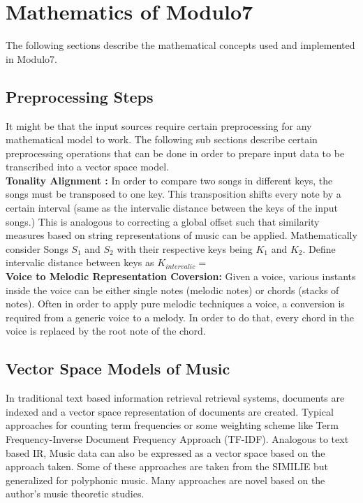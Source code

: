 \chapter{Mathematics of Modulo7}
\label{sec:mir math}

\noindent The following sections describe the mathematical concepts used and implemented in Modulo7.

\section{Preprocessing Steps} \label{sim:preprocess}

\noindent It might be that the input sources require certain preprocessing for any mathematical model to work. The following sub sections describe certain preprocessing operations that can be done in order to prepare input data to be transcribed into a vector space model. \\

\noindent \textbf{Tonality Alignment :} In order to compare two songs in different keys, the songs must be transposed to one key. This transposition shifts every note by a certain interval (same as the intervalic distance between the keys of the input songs.) This is analogous to correcting a global offset such that similarity measures based on string representations of music can be applied. Mathematically consider Songs $S_1$ and $S_2$ with their respective keys being $K_1$ and $K_2$. Define intervalic distance between keys as $K_{intervalic} = $ \\

\noindent \textbf{Voice to Melodic Representation Coversion: } \label{voicemelconv} Given a voice, various instants inside the voice can be either single notes (melodic notes) or chords (stacks of notes). Often in order to apply pure melodic techniques a voice, a conversion is required from a generic voice to a melody. In order to do that, every chord in the voice is replaced by the root note of the chord. 

\section{Vector Space Models of Music}

\noindent In traditional text based information retrieval retrieval systems, documents are indexed and a vector space representation of documents are created. Typical approaches for counting term frequencies or some weighting scheme like Term Frequency-Inverse Document Frequency Approach (TF-IDF). Analogous to text based IR, Music data can also be expressed as a vector space based on the approach taken. Some of these approaches are taken from the SIMILIE \cite{similietechnicalmanual} but generalized for polyphonic music. Many approaches are novel based on the author's music theoretic studies. 

